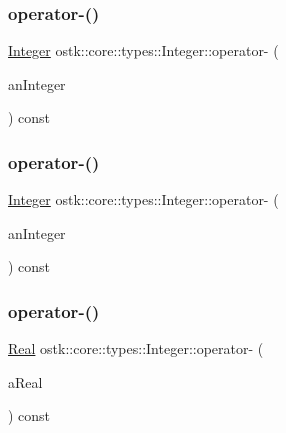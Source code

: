 \subsubsection{\texorpdfstring{operator-\/()}{operator-()}\hspace{0.1cm}{\footnotesize\ttfamily [1/4]}}
{\footnotesize\ttfamily \hyperlink{classostk_1_1core_1_1types_1_1_integer}{Integer} ostk\+::core\+::types\+::\+Integer\+::operator-\/ (\begin{DoxyParamCaption}\item[{const \hyperlink{classostk_1_1core_1_1types_1_1_integer}{Integer} \&}]{an\+Integer }\end{DoxyParamCaption}) const}

\mbox{\label{classostk_1_1core_1_1types_1_1_integer_a13ba6fbc9946131d5071959e0f284876}} 
\subsubsection{\texorpdfstring{operator-\/()}{operator-()}\hspace{0.1cm}{\footnotesize\ttfamily [2/4]}}
{\footnotesize\ttfamily \hyperlink{classostk_1_1core_1_1types_1_1_integer}{Integer} ostk\+::core\+::types\+::\+Integer\+::operator-\/ (\begin{DoxyParamCaption}\item[{const \hyperlink{classostk_1_1core_1_1types_1_1_integer_a76a5f41f78659f116eafaf26cecc3244}{Integer\+::\+Value\+Type} \&}]{an\+Integer }\end{DoxyParamCaption}) const}

\mbox{\label{classostk_1_1core_1_1types_1_1_integer_a0e4654451bb3507153130180a5e247cd}} 
\subsubsection{\texorpdfstring{operator-\/()}{operator-()}\hspace{0.1cm}{\footnotesize\ttfamily [3/4]}}
{\footnotesize\ttfamily \hyperlink{classostk_1_1core_1_1types_1_1_real}{Real} ostk\+::core\+::types\+::\+Integer\+::operator-\/ (\begin{DoxyParamCaption}\item[{const \hyperlink{classostk_1_1core_1_1types_1_1_real}{Real} \&}]{a\+Real }\end{DoxyParamCaption}) const}

